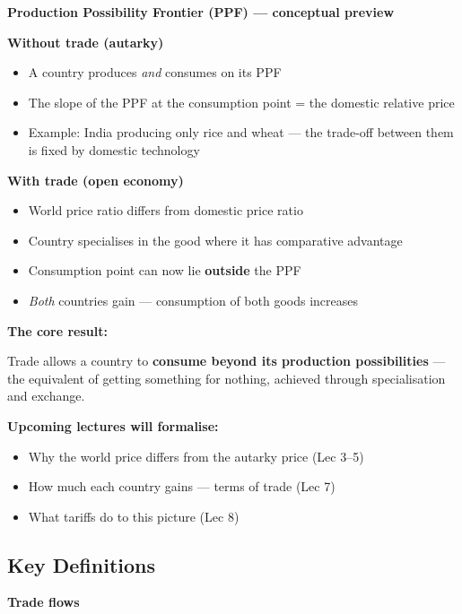 \documentclass[
  letterpaper,
  DIV=11,
  numbers=noendperiod]{scrartcl}
\providecommand{\tightlist}{%
  \setlength{\itemsep}{0pt}\setlength{\parskip}{0pt}}
\begin{document}
\textbf{Production Possibility Frontier (PPF) --- conceptual preview}

\textbf{Without trade (autarky)}

\begin{itemize}
\tightlist
\item
  A country produces \emph{and} consumes on its PPF
\item
  The slope of the PPF at the consumption point = the domestic relative
  price
\item
  Example: India producing only rice and wheat --- the trade-off between
  them is fixed by domestic technology
\end{itemize}

\textbf{With trade (open economy)}

\begin{itemize}
\tightlist
\item
  World price ratio differs from domestic price ratio
\item
  Country specialises in the good where it has comparative advantage
\item
  Consumption point can now lie \textbf{outside} the PPF
\item
  \emph{Both} countries gain --- consumption of both goods increases
\end{itemize}

\textbf{The core result:}

Trade allows a country to \textbf{consume beyond its production
possibilities} --- the equivalent of getting something for nothing,
achieved through specialisation and exchange.

\textbf{Upcoming lectures will formalise:}

\begin{itemize}
\tightlist
\item
  Why the world price differs from the autarky price (Lec 3--5)
\item
  How much each country gains --- terms of trade (Lec 7)
\item
  What tariffs do to this picture (Lec 8)
\end{itemize}

\subsection{Key Definitions}\label{key-definitions}

\textbf{Trade flows}
\end{document}
